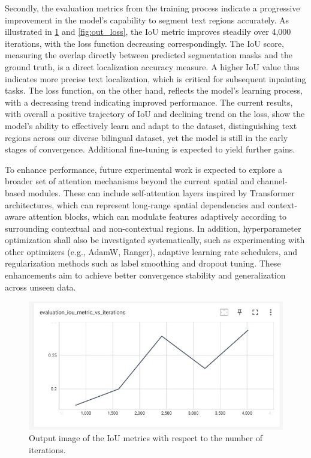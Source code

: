 \documentclass[10pt,twocolumn,letterpaper]{article}
\begin{document}
Secondly, the evaluation metrics from the training process indicate a progressive improvement in the model's capability to segment text regions accurately. 
As illustrated in \cref{fig:out_iou} and \cref{fig:out_loss}, the IoU metric improves steadily over 4,000 iterations, with the loss function decreasing correspondingly.
The IoU score, measuring the overlap directly between predicted segmentation masks and the ground truth, is a direct localization accuracy measure. A higher IoU value 
thus indicates more precise text localization, which is critical for subsequent inpainting tasks. The loss function, on the other hand, reflects the model's learning process, 
with a decreasing trend indicating improved performance.
The current results, with overall a positive trajectory of IoU and declining trend on the loss, show the model's ability to effectively learn and adapt to the dataset, distinguishing 
text regions across our diverse bilingual dataset, yet the model is still in the early stages of convergence. Additional fine-tuning is expected to yield further gains.

To enhance performance, future experimental work is expected to explore a broader set of attention mechanisms beyond the current spatial and channel-based modules. 
These can include self-attention layers inspired by Transformer architectures, which can represent long-range spatial dependencies and context-aware attention blocks, which can 
modulate features adaptively according to surrounding contextual and non-contextual regions. In addition, hyperparameter optimization shall also be investigated systematically, 
such as experimenting with other optimizers (e.g., AdamW, Ranger), adaptive learning rate schedulers, and regularization methods such as label smoothing and dropout tuning. 
These enhancements aim to achieve better convergence stability and generalization across unseen data.

\begin{figure}[t]
    \centering
    \includegraphics[width=\linewidth]{figures/milestone/out_iou.jpg}
    \caption{Output image of the IoU metrics with respect to the number of iterations. }
    \label{fig:out_iou}
\end{figure}
\end{document}
